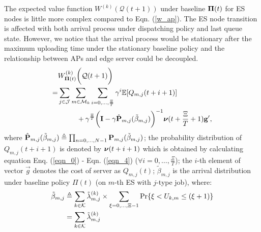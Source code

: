 The expected value function $W^{(k)}(\mathcal{Q}(t+1))$ under baseline $\boldsymbol{\Pi}(t)$ for ES nodes is little more complex compared to Eqn. (\ref{w_ap}).
The ES node transition is affected with both arrival process under dispatching policy and last queue state.
However, we notice that the arrival process would be stationary after the maximum uploading time under the stationary baseline policy and the relationship between APs and edge server could be decoupled.
\begin{align}
    &W^{(k)}_{\boldsymbol{\Pi}(t)}\bigg(\mathcal{Q}(t+1)\bigg)
    \nonumber\\
    =& \sum_{j\in\mathcal{J}}\sum_{m\in\mathcal{M}_{k}}\sum_{i=0,\dots,\frac{\Xi}{T}} \gamma^{i} \mathbb{E}[ Q_{m,j}({t+i+1}) ]
    \nonumber\\
    &~~~~~~~~+ \gamma^{\frac{\Xi}{T}} \bigg( \mathbf{I} - \gamma \hat{\mathbf{P}}_{m,j}(\tilde{\beta}_{m,j}) \bigg)^{-1} \boldsymbol{\nu}({t+\frac{\Xi}{T}+1}) \mathbf{g}',
\end{align}
where $\hat{\mathbf{P}}_{m,j}(\tilde{\beta}_{m,j}) \triangleq \prod_{n=0,\dots,N-1} \mathbf{P}_{m,j}(\tilde{\beta}_{m,j})$;
the probability distribution of $Q_{m,j}({t+i+1})$ is denoted by $\boldsymbol{\nu}({t+i+1})$ which is obtained by calculating equation Enq. (\ref{eqn_0}) - Eqn. (\ref{eqn_4}) ($\forall i=0,\dots,\frac{\Xi}{T}$);
the $i$-th element of vector $\vec{g}$ denotes the cost of server as $Q_{m,j}(t)$;
$\tilde{\beta}_{m,j}$ is the arrival distribution under baseline policy $\Pi(t)$ (on $m$-th ES with $j$-type job), where:
\begin{align}
    \tilde{\beta}_{m,j} &\triangleq \sum_{k\in\mathcal{K}} \tilde{\lambda}^{(k)}_{m,j} \times \sum_{\xi=0,\dots,\Xi-1} \Pr\{ \xi<U_{k,m}\leq(\xi+1) \}
        \nonumber\\
    ~~~~&= \sum_{k\in\mathcal{K}} \tilde{\lambda}^{(k)}_{m,j}
\end{align}

